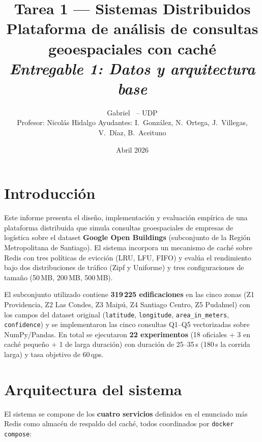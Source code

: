 \documentclass[11pt,a4paper]{article}
\title{\vspace{-1.2cm}
\textbf{Tarea 1 — Sistemas Distribuidos} \\[4pt]
\large Plataforma de análisis de consultas geoespaciales con caché \\
\large \textit{Entregable 1: Datos y arquitectura base}}
\author{Gabriel \ -- UDP \\
\small Profesor: Nicolás Hidalgo \quad
Ayudantes: I.\ González, N.\ Ortega, J.\ Villegas, V.\ Díaz, B.\ Aceituno}
\date{Abril 2026}
\begin{document}
\maketitle
\vspace{-6pt}

\section{Introducción}
Este informe presenta el diseño, implementación y evaluación empírica de
una plataforma distribuida que simula consultas geoespaciales de empresas de
logística sobre el dataset \textbf{Google Open Buildings} (subconjunto de la
Región Metropolitana de Santiago). El sistema incorpora un mecanismo de
caché sobre Redis con tres políticas de evicción (LRU, LFU, FIFO) y evalúa
el rendimiento bajo dos distribuciones de tráfico (Zipf y Uniforme) y tres
configuraciones de tamaño (50\,MB, 200\,MB, 500\,MB).

El subconjunto utilizado contiene \textbf{319\,225 edificaciones} en las
cinco zonas (Z1 Providencia, Z2 Las Condes, Z3 Maipú, Z4 Santiago Centro,
Z5 Pudahuel) con los campos del dataset original (\texttt{latitude},
\texttt{longitude}, \texttt{area\_in\_meters}, \texttt{confidence}) y se
implementaron las cinco consultas Q1--Q5 vectorizadas sobre NumPy/Pandas.
En total se ejecutaron \textbf{22 experimentos} (18 oficiales + 3 en caché
pequeño + 1 de larga duración) con duración de 25--35\,s (180\,s la corrida
larga) y tasa objetivo de 60\,qps.

\section{Arquitectura del sistema}

El sistema se compone de los \textbf{cuatro servicios} definidos en el
enunciado más Redis como almacén de respaldo del caché, todos coordinados
por \texttt{docker compose}:
\end{document}
